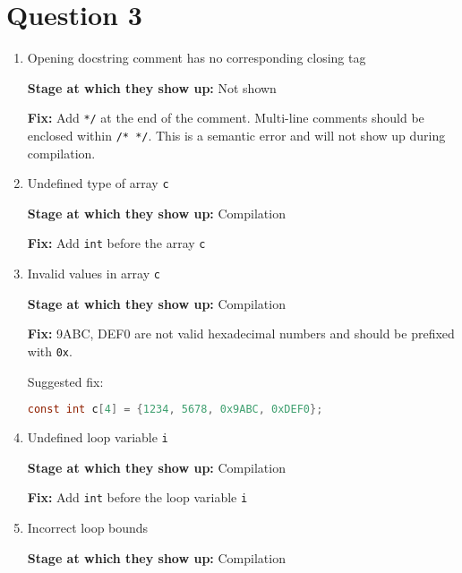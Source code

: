 \section*{Question 3}



\begin{enumerate}

    \item Opening docstring comment has no corresponding closing tag

          \textbf{Stage at which they show up:}
          Not shown

          \textbf{Fix:}
          Add \texttt{*/} at the end of the comment.
          Multi-line comments should be enclosed within \texttt{/* */}.
          This is a semantic error and will not show up during compilation.

    \item Undefined type of array \texttt{c}

          \textbf{Stage at which they show up:}
          Compilation

          \textbf{Fix:}
          Add \texttt{int} before the array \texttt{c}

    \item Invalid values in array \texttt{c}

          \textbf{Stage at which they show up:}
          Compilation

          \textbf{Fix:}
          9ABC, DEF0 are not valid hexadecimal numbers and should be prefixed with \texttt{0x}.

          Suggested fix:
          \begin{lstlisting}[language=C, frame=single]
const int c[4] = {1234, 5678, 0x9ABC, 0xDEF0};
            \end{lstlisting}

    \item Undefined loop variable \texttt{i}

          \textbf{Stage at which they show up:}
          Compilation

          \textbf{Fix:}
          Add \texttt{int} before the loop variable \texttt{i}

    \item Incorrect loop bounds

          \textbf{Stage at which they show up:}
          Compilation


\end{enumerate}
